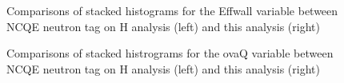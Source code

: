 \begin{figure}[!htbp]
    \centering
    
    \caption{Comparisons of stacked histograms for the Effwall variable between NCQE neutron tag on H analysis (left) and this analysis (right)} \label{fig:effwall_reduction} 
    
      \hfill 
     \par
    
        
\end{figure}

\begin{figure}[!htbp]
    \centering
    
    \caption{Comparisons of stacked histrograms for the ovaQ variable between NCQE neutron tag on H analysis (left) and this analysis (right)} \label{fig:ovaq_reduction} 
    
     \hfill 
     \par
    
        
\end{figure}

